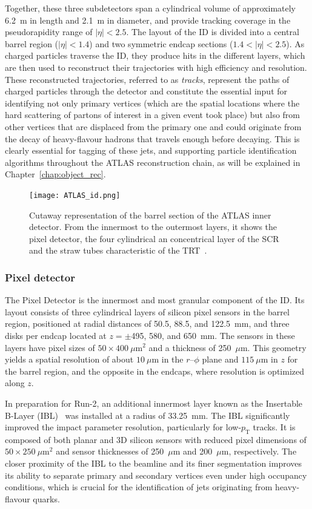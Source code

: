 Together, these three subdetectors span a cylindrical volume of approximately 6.2~m in length and 2.1~m in diameter, and provide tracking coverage in the pseudorapidity range of $|\eta| < 2.5$. The layout of the ID is divided into a central barrel region ($|\eta| < 1.4$) and two symmetric endcap sections ($1.4 < |\eta| < 2.5$). As charged particles traverse the ID, they produce hits in the different layers, which are then used to reconstruct their trajectories with high efficiency and resolution. 
These reconstructed trajectories, referred to as \textit{tracks}, represent the paths of charged particles through the detector and constitute the essential input for identifying not only primary vertices (which are the spatial locations where the hard scattering of partons of interest in a given event took place) but also from other vertices that are displaced from the primary one and could originate from the decay of heavy-flavour hadrons that travels enough before decaying. This is clearly essential for tagging of these jets, and supporting particle identification algorithms throughout the ATLAS reconstruction chain, as will be explained in Chapter~\ref{chap:object_rec}.
\begin{figure}[htbp]
    \centering
        \texttt{[image: ATLAS\_id.png]}
    \caption{Cutaway representation of the barrel section of the ATLAS inner detector. From the innermost to the outermost layers, it shows the pixel detector, the four cylindrical an concentrical layer of the SCR and the straw tubes characteristic of the TRT~\cite{Collaboration:2723878}.}
    \label{fig:id}
\end{figure}

\subsubsection*{Pixel detector}

The Pixel Detector is the innermost and most granular component of the ID. Its layout consists of three cylindrical layers of silicon pixel sensors in the barrel region, positioned at radial distances of 50.5, 88.5, and 122.5~mm, and three disks per endcap located at $z = \pm$495, 580, and 650~mm. The sensors in these layers have pixel sizes of $50 \times 400~\mu\text{m}^2$ and a thickness of 250~$\mu$m. This geometry yields a spatial resolution of about $10~\mu$m in the $r\text{--}\phi$ plane and $115~\mu$m in $z$ for the barrel region, and the opposite in the endcaps, where resolution is optimized along $z$.

In preparation for Run-2, an additional innermost layer known as the Insertable B-Layer (IBL)~\cite{IBL} was installed at a radius of 33.25~mm. The IBL significantly improved the impact parameter resolution, particularly for low-$p_{\mathrm{T}}$ tracks. It is composed of both planar and 3D silicon sensors with reduced pixel dimensions of $50 \times 250~\mu\text{m}^2$ and sensor thicknesses of 250~$\mu$m and 200~$\mu$m, respectively. The closer proximity of the IBL to the beamline and its finer segmentation improves its ability to separate primary and secondary vertices even under high occupancy conditions, which is crucial for the identification of jets originating from heavy-flavour quarks.

